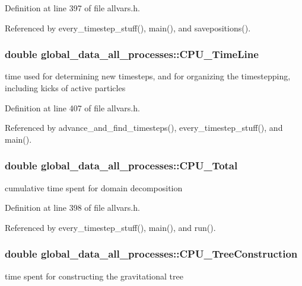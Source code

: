 Definition at line 397 of file allvars.h.



Referenced by every\_\-timestep\_\-stuff(), main(), and savepositions().

\hypertarget{structglobal__data__all__processes_a675f7230ece5f6d88fcc0384a8e1f6c9}{
\subsubsection[{CPU\_\-TimeLine}]{\setlength{\rightskip}{0pt plus 5cm}double {\bf global\_\-data\_\-all\_\-processes::CPU\_\-TimeLine}}}
\label{structglobal__data__all__processes_a675f7230ece5f6d88fcc0384a8e1f6c9}
time used for determining new timesteps, and for organizing the timestepping, including kicks of active particles 

Definition at line 407 of file allvars.h.



Referenced by advance\_\-and\_\-find\_\-timesteps(), every\_\-timestep\_\-stuff(), and main().

\hypertarget{structglobal__data__all__processes_a3d87cd9a94ce540341d4fb713b253c9e}{
\subsubsection[{CPU\_\-Total}]{\setlength{\rightskip}{0pt plus 5cm}double {\bf global\_\-data\_\-all\_\-processes::CPU\_\-Total}}}
\label{structglobal__data__all__processes_a3d87cd9a94ce540341d4fb713b253c9e}
cumulative time spent for domain decomposition 

Definition at line 398 of file allvars.h.



Referenced by every\_\-timestep\_\-stuff(), main(), and run().

\hypertarget{structglobal__data__all__processes_ac9eb650a8550b48eb464b6a0a8629a27}{
\subsubsection[{CPU\_\-TreeConstruction}]{\setlength{\rightskip}{0pt plus 5cm}double {\bf global\_\-data\_\-all\_\-processes::CPU\_\-TreeConstruction}}}
\label{structglobal__data__all__processes_ac9eb650a8550b48eb464b6a0a8629a27}
time spent for constructing the gravitational tree 

